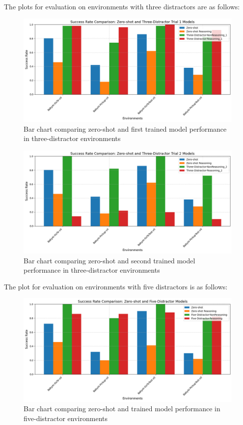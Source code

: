 \documentclass[11pt,a4paper]{article}
\begin{document}
\newpage
The plots for evaluation on environments with three distractors are as follows:
\begin{figure}[H]
    \centering
    \includegraphics[width=1\linewidth]
    {../images/3-distractor-trial-1}
    \caption{Bar chart comparing zero-shot and first trained model performance in three-distractor environments}
\end{figure}
\begin{figure}[H]
    \centering
    \includegraphics[width=1\linewidth]
    {../images/3-distractor-trial-2}
    \caption{Bar chart comparing zero-shot and second trained model performance in three-distractor environments}
\end{figure}
\newpage
The plot for evaluation on environments with five distractors is as follows:
\begin{figure}[H]
    \centering
    \includegraphics[width=1\linewidth]
    {../images/5-distractor}
    \caption{Bar chart comparing zero-shot and trained model performance in five-distractor environments}
\end{figure}
\end{document}
